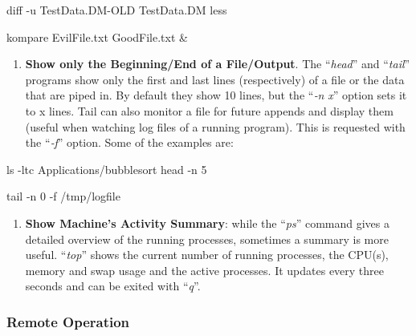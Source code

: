 \documentclass[
]{article}
\begin{document}
diff -u TestData.DM-OLD TestData.DM \textbar{} less

kompare EvilFile.txt GoodFile.txt \&

\begin{enumerate}
\def\labelenumi{\alph{enumi}.}
\setcounter{enumi}{3}
\item
  \textbf{Show only the Beginning/End of a File/Output}. The
  ``\emph{head}'' and ``\emph{tail}'' programs show only the first and
  last lines (respectively) of a file or the data that are piped in. By
  default they show 10 lines, but the ``\emph{‑n x}'' option sets it to
  x lines. Tail can also monitor a file for future appends and display
  them (useful when watching log files of a running program). This is
  requested with the ``\emph{‑f}'' option. Some of the examples are:
\end{enumerate}

ls -ltc Applications/bubblesort \textbar{} head -n 5

tail -n 0 -f /tmp/logfile

\begin{enumerate}
\def\labelenumi{\alph{enumi}.}
\setcounter{enumi}{4}
\item
  \textbf{Show Machine's Activity Summary}: while the ``\emph{ps}''
  command gives a detailed overview of the running processes, sometimes
  a summary is more useful. ``\emph{top}'' shows the current number of
  running processes, the CPU(s), memory and swap usage and the active
  processes. It updates every three seconds and can be exited with
  ``\emph{q}''.
\end{enumerate}

\hypertarget{remote-operation}{%
\subsubsection{Remote Operation}\label{remote-operation}}
\end{document}
